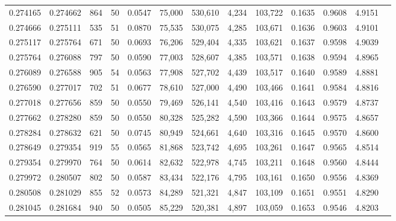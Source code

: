 \begin{tabular}{rrrrrrrrrrrrr}
0.274165 & 0.274662 &   864 &  50 &                                     0.0547 &  75,000 & 530,610 &   4,234 & 103,722 & 0.1635 & 0.9608 & 4.9151 \\
0.274666 & 0.275111 &   535 &  51 &                                     0.0870 &  75,535 & 530,075 &   4,285 & 103,671 & 0.1636 & 0.9603 & 4.9101 \\
0.275117 & 0.275764 &   671 &  50 &                                     0.0693 &  76,206 & 529,404 &   4,335 & 103,621 & 0.1637 & 0.9598 & 4.9039 \\
0.275764 & 0.276088 &   797 &  50 &                                     0.0590 &  77,003 & 528,607 &   4,385 & 103,571 & 0.1638 & 0.9594 & 4.8965 \\
0.276089 & 0.276588 &   905 &  54 &                                     0.0563 &  77,908 & 527,702 &   4,439 & 103,517 & 0.1640 & 0.9589 & 4.8881 \\
0.276590 & 0.277017 &   702 &  51 &                                     0.0677 &  78,610 & 527,000 &   4,490 & 103,466 & 0.1641 & 0.9584 & 4.8816 \\
0.277018 & 0.277656 &   859 &  50 &                                     0.0550 &  79,469 & 526,141 &   4,540 & 103,416 & 0.1643 & 0.9579 & 4.8737 \\
0.277662 & 0.278280 &   859 &  50 &                                     0.0550 &  80,328 & 525,282 &   4,590 & 103,366 & 0.1644 & 0.9575 & 4.8657 \\
0.278284 & 0.278632 &   621 &  50 &                                     0.0745 &  80,949 & 524,661 &   4,640 & 103,316 & 0.1645 & 0.9570 & 4.8600 \\
0.278649 & 0.279354 &   919 &  55 &                                     0.0565 &  81,868 & 523,742 &   4,695 & 103,261 & 0.1647 & 0.9565 & 4.8514 \\
0.279354 & 0.279970 &   764 &  50 &                                     0.0614 &  82,632 & 522,978 &   4,745 & 103,211 & 0.1648 & 0.9560 & 4.8444 \\
0.279972 & 0.280507 &   802 &  50 &                                     0.0587 &  83,434 & 522,176 &   4,795 & 103,161 & 0.1650 & 0.9556 & 4.8369 \\
0.280508 & 0.281029 &   855 &  52 &                                     0.0573 &  84,289 & 521,321 &   4,847 & 103,109 & 0.1651 & 0.9551 & 4.8290 \\
0.281045 & 0.281684 &   940 &  50 &                                     0.0505 &  85,229 & 520,381 &   4,897 & 103,059 & 0.1653 & 0.9546 & 4.8203 \\

\end{tabular}
